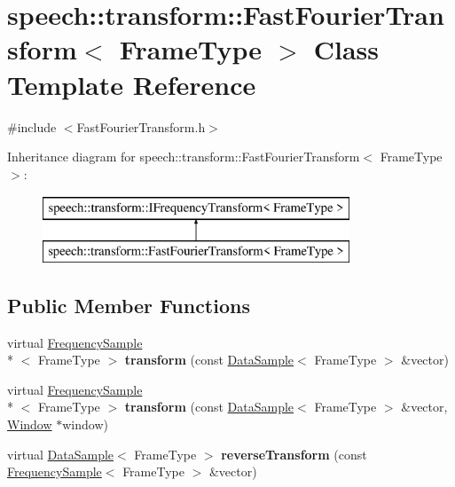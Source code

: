 \hypertarget{classspeech_1_1transform_1_1FastFourierTransform}{\section{speech\+:\+:transform\+:\+:Fast\+Fourier\+Transform$<$ Frame\+Type $>$ Class Template Reference}
\label{classspeech_1_1transform_1_1FastFourierTransform}
}


{\ttfamily \#include $<$Fast\+Fourier\+Transform.\+h$>$}

Inheritance diagram for speech\+:\+:transform\+:\+:Fast\+Fourier\+Transform$<$ Frame\+Type $>$\+:\begin{figure}[H]
\begin{center}
\leavevmode
\includegraphics[height=2.000000cm]{classspeech_1_1transform_1_1FastFourierTransform}
\end{center}
\end{figure}
\subsection*{Public Member Functions}
\begin{DoxyCompactItemize}
\item 
\hypertarget{classspeech_1_1transform_1_1FastFourierTransform_ae41aa58b3e4791f5ad8301c766d49d07}{virtual \hyperlink{classspeech_1_1raw__data_1_1FrequencySample}{Frequency\+Sample}\\*
$<$ Frame\+Type $>$ {\bfseries transform} (const \hyperlink{classspeech_1_1raw__data_1_1DataSample}{Data\+Sample}$<$ Frame\+Type $>$ \&vector)}\label{classspeech_1_1transform_1_1FastFourierTransform_ae41aa58b3e4791f5ad8301c766d49d07}

\item 
\hypertarget{classspeech_1_1transform_1_1FastFourierTransform_a34e2dfc18a51fd33a807b8f8c829d912}{virtual \hyperlink{classspeech_1_1raw__data_1_1FrequencySample}{Frequency\+Sample}\\*
$<$ Frame\+Type $>$ {\bfseries transform} (const \hyperlink{classspeech_1_1raw__data_1_1DataSample}{Data\+Sample}$<$ Frame\+Type $>$ \&vector, \hyperlink{classspeech_1_1transform_1_1window_1_1Window}{Window} $\ast$window)}\label{classspeech_1_1transform_1_1FastFourierTransform_a34e2dfc18a51fd33a807b8f8c829d912}

\item 
\hypertarget{classspeech_1_1transform_1_1FastFourierTransform_a0d6f84abf032495e9bbade561b3e8c5f}{virtual \hyperlink{classspeech_1_1raw__data_1_1DataSample}{Data\+Sample}$<$ Frame\+Type $>$ {\bfseries reverse\+Transform} (const \hyperlink{classspeech_1_1raw__data_1_1FrequencySample}{Frequency\+Sample}$<$ Frame\+Type $>$ \&vector)}\label{classspeech_1_1transform_1_1FastFourierTransform_a0d6f84abf032495e9bbade561b3e8c5f}

\end{DoxyCompactItemize}
